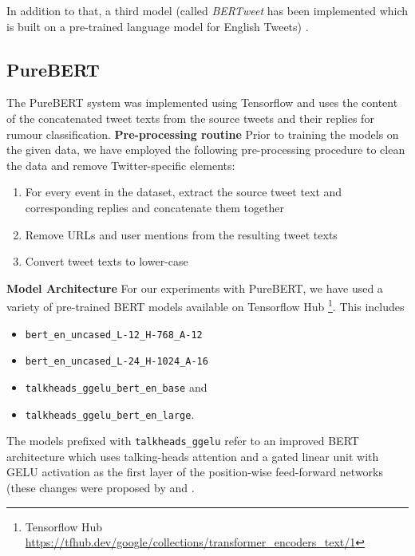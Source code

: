 \documentclass[11pt,a4paper]{article}
\begin{document}
In addition to that, a third model (called \textit{BERTweet} has been implemented which is built on a pre-trained language model for English Tweets) \citep{RN683}. 

\subsection{PureBERT}
\label{sec:purebert}
The PureBERT system was implemented using Tensorflow \citep{RN681} and uses the content of the concatenated tweet texts from the source tweets and their replies for rumour classification. 
\newline
\newline
\textbf{Pre-processing routine}
\newline
Prior to training the models on the given data, we have employed the following pre-processing procedure to clean the data and remove Twitter-specific elements:
\begin{enumerate}[noitemsep]
    \item For every event in the dataset, extract the source tweet text and corresponding replies and concatenate them together
    \item Remove URLs and user mentions from the resulting tweet texts
    \item Convert tweet texts to lower-case
\end{enumerate}
\textbf{Model Architecture}
\newline
For our experiments with PureBERT, we have used a variety of pre-trained BERT models available on Tensorflow Hub \footnote{Tensorflow Hub \url{https://tfhub.dev/google/collections/transformer_encoders_text/1}}. This includes
\begin{itemize}[noitemsep,topsep=2pt,parsep=0pt,partopsep=0pt]
    \item \verb|bert_en_uncased_L-12_H-768_A-12|
    \item \verb|bert_en_uncased_L-24_H-1024_A-16|
    \item \verb|talkheads_ggelu_bert_en_base| and 
    \item \verb|talkheads_ggelu_bert_en_large|.
\end{itemize}
The models prefixed with \verb|talkheads_ggelu| refer to an improved BERT architecture which uses talking-heads attention and a gated linear unit with GELU activation as the first layer of the position-wise feed-forward networks (these changes were proposed by 
\citep{RN685} and \citep{RN686}.
\end{document}
